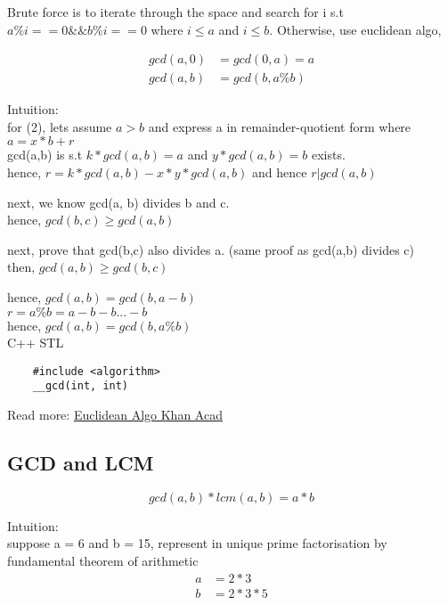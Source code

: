 \documentclass[12pt]{article}
\begin{document}
Brute force is to iterate through the space and search for i s.t \(a \% i == 0 \&\& b \% i == 0\) where \(i \leq a\) and \(i \leq b\). Otherwise, use euclidean algo, 

\begin{align}  
	gcd(a, 0) &= gcd(0, a) = a \tag{base case} \\
	gcd(a, b) &= gcd(b, a \% b) \tag{recursive case}
\end{align}

Intuition: \\

for (2), lets assume \(a > b\) and express a in remainder-quotient form where \(a = x * b + r \) \\ 
gcd(a,b) is s.t \(k * gcd(a, b) = a\) and \(y * gcd(a,b) = b\) exists. \\
hence, \(r = k * gcd(a, b) - x* y * gcd(a, b)\) and hence \(r | gcd(a, b)\)

next, we know gcd(a, b) divides b and c. \\
hence, \(gcd(b, c) \geq gcd(a, b) \)

next, prove that gcd(b,c) also divides a. (same proof as gcd(a,b) divides c) \\
then, \(gcd(a,b) \geq gcd(b,c)\) 

hence, \(gcd(a,b) = gcd(b,a - b)\) \\ 
\( r = a \% b = a - b - b ... - b \) \\ 
hence, \(gcd(a,b) = gcd(b, a \% b) \) \\ [\baselineskip] 

C++ STL  
\begin{verbatim}
	#include <algorithm> 
 	__gcd(int, int)
\end{verbatim} 

Read more: \href{https://www.khanacademy.org/computing/computer-science/cryptography/modarithmetic/a/the-euclidean-algorithm}{Euclidean Algo Khan Acad} 

\subsection{GCD and LCM}
\[ gcd(a, b) * lcm(a, b) = a * b \]

Intuition: \\ 

suppose a = 6 and b = 15, represent in unique prime factorisation by fundamental theorem of arithmetic 
\begin{align} 
a &= 2 * 3 \\
b &= 2 * 3 * 5 
\end{align} 
\end{document}

